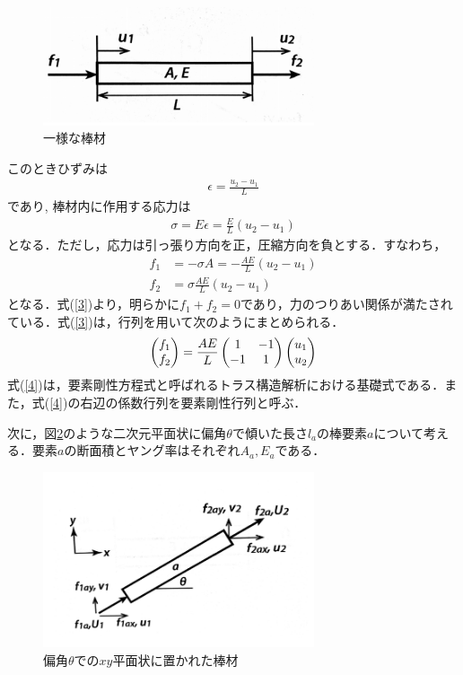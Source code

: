 \documentclass[a4paper,11pt,uplatex]{jsarticle}
\begin{document}
\begin{figure}[H]
  \begin{center}
    \includegraphics[width = 8cm]{画像/stick.png}
    \caption{一様な棒材}
    \label{棒材}
  \end{center}
\end{figure}

このときひずみは
\begin{align}
  \epsilon = \frac{u_2-u_1}{L}
\end{align}
であり, 棒材内に作用する応力は
\begin{align}
  \sigma = E\epsilon = \frac{E}{L}(u_2-u_1)
\end{align}
となる．ただし，応力は引っ張り方向を正，圧縮方向を負とする．すなわち，
\begin{align}
  \label{3}
  f_1 &= -\sigma A = -\frac{AE}{L}(u_2 - u_1) \\
  f_2 &= \sigma \frac{AE}{L}(u_2 - u_1)
\end{align}
となる．式(\ref{3})より，明らかに$f_1 + f_2 = 0$であり，力のつりあい関係が満たされている．式(\ref{3})は，行列を用いて次のようにまとめられる．
\begin{align}
  \label{4}
  \begin{pmatrix} f_1 \\ f_2 \end{pmatrix} = \frac{AE}{L} \begin{pmatrix} 1 & -1 \\ -1 & 1 \end{pmatrix} \begin{pmatrix} u_1 \\ u_2 \end{pmatrix}
\end{align}
式(\ref{4})は，要素剛性方程式と呼ばれるトラス構造解析における基礎式である．また，式(\ref{4})の右辺の係数行列を要素剛性行列と呼ぶ．
\par
次に，図\ref{xy棒材}のような二次元平面状に偏角$\theta$で傾いた長さ$l_a$の棒要素$a$について考える．要素$a$の断面積とヤング率はそれぞれ$A_a, E_a$である．

\begin{figure}[H]
  \begin{center}
    \includegraphics[width = 8cm]{画像/xystick.png}
    \caption{偏角$\theta$での$xy$平面状に置かれた棒材}
    \label{xy棒材}
  \end{center}
\end{figure}
\end{document}
